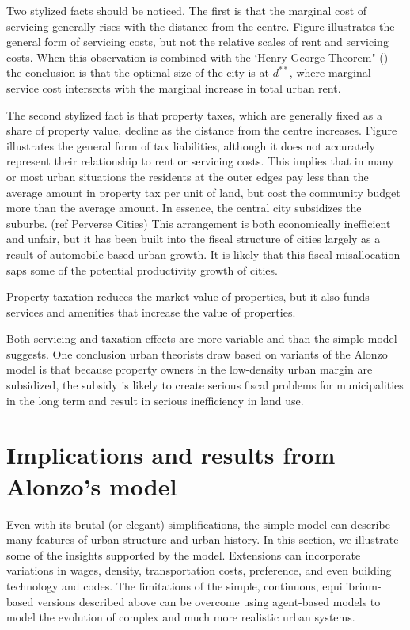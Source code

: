 Two stylized facts should be noticed. The first is that the marginal cost of servicing generally  rises with the distance from the centre.  Figure
illustrates the general form of servicing costs, but not  the relative scales of rent and servicing costs. When this observation is combined with the `Henry George Theorem" () the conclusion is that the optimal size of the city  is at  $d^{**}$, where marginal service cost intersects with the marginal increase in total urban rent. 


The second stylized fact  is that property taxes, which are generally  fixed as a share of property value, decline as the distance from the centre increases. Figure %
illustrates the general form of tax liabilities, although it does not  accurately represent their relationship to rent or  servicing costs.  This implies that in many or most urban situations the residents at the outer edges pay less than the average amount in property tax per unit of land, but cost  the community budget more than the average amount. In essence, the central city subsidizes the suburbs. (ref Perverse Cities)
This arrangement is both economically inefficient and unfair, but it has been built into the fiscal structure of cities largely as a result of automobile-based urban growth. It is likely that this fiscal misallocation saps some of the potential productivity growth of cities.

Property taxation reduces the market value of properties, but it also funds services and amenities that increase the value of properties. 

Both servicing and taxation effects are more variable and than the simple model suggests.  One  conclusion urban theorists draw based on variants of the Alonzo model is that because property owners in the low-density urban margin are subsidized,  the subsidy is likely to create serious fiscal problems for municipalities in the long term and result in serious inefficiency in land use. 


 \section{Implications and results from Alonzo's  model}
 Even with its brutal (or elegant) simplifications, the simple model  can  describe  many features of urban structure and urban history. In this section, we illustrate some of the insights supported by the model. Extensions can incorporate variations in wages, density, transportation costs,  preference, and even building technology and codes. The limitations of the simple, continuous, equilibrium-based versions described above can be overcome using agent-based models to model the evolution of complex and much more realistic urban systems. 


